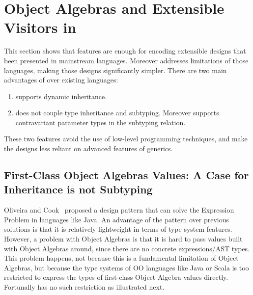 \section{Object Algebras and Extensible Visitors in \name}

This section shows that \name features are enough for encoding extensible designs that
been presented in mainstream languages. Moreover \name addresses
limitations of those languages, making those designs
significantly simpler. There are two main advantages of \name
over existing languages:
\begin{enumerate}
\item \name supports dynamic inheritance.
\item \name does not couple type inheritance and subtyping. Moreover
\name supports contravariant parameter types in the subtyping
relation.
\end{enumerate}

These two features avoid the use of low-level programming
techniques, and make the designs less reliant on advanced
features of generics.

\subsection{First-Class Object Algebras Values: A Case for Inheritance
is not Subtyping}
\label{sec:objectalgebra}

Oliveira and Cook~\cite{} proposed a design pattern that can
solve the Expression Problem in languages like Java. An
advantage of the pattern over previous solutions is that it is
relatively lightweight in terms of type system features. However, 
a problem with Object Algebras is that it is hard to pass 
values built with Object Algebras around, since there are 
no concrete expressions/AST types. This problem happens, not 
because this is a fundamental limitation of Object Algebras, but 
because the type systems of OO languages like Java or Scala 
is too restricted to express the types of first-class Object Algebra
values directly. Fortunally \name has no such restriction as
illustrated next. 

